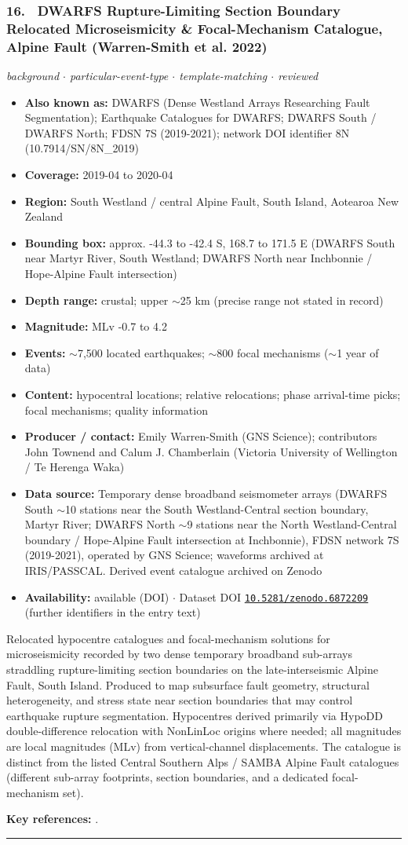 \documentclass[10pt,a4paper]{article}
\newcommand{\catentryrule}{\par\vspace{3pt}\noindent\textcolor{rulegrey}{\rule{\linewidth}{0.3pt}}\par\vspace{5pt}}
\newcommand{\kv}[2]{\item \textbf{#1:} #2}
\begin{document}
\subsubsection*{\hypertarget{c:16}{16.}~ DWARFS Rupture-Limiting Section Boundary Relocated Microseismicity \& Focal-Mechanism Catalogue, Alpine Fault (Warren-Smith et al. 2022)}
{\small\itshape background $\cdot$ particular-event-type $\cdot$ template-matching $\cdot$ reviewed}\par\vspace{2pt}
\begin{itemize}[leftmargin=1.3em,itemsep=0.6pt,topsep=1pt,parsep=0pt]
\kv{Also known as}{DWARFS (Dense Westland Arrays Researching Fault Segmentation); Earthquake Catalogues for DWARFS; DWARFS South / DWARFS North; FDSN 7S (2019-2021); network DOI identifier 8N (10.7914/SN/8N\_2019)}
\kv{Coverage}{2019-04 to 2020-04}
\kv{Region}{South Westland / central Alpine Fault, South Island, Aotearoa New Zealand}
\kv{Bounding box}{approx. -44.3 to -42.4 S, 168.7 to 171.5 E (DWARFS South near Martyr River, South Westland; DWARFS North near Inchbonnie / Hope-Alpine Fault intersection)}
\kv{Depth range}{crustal; upper $\sim$25 km (precise range not stated in record)}
\kv{Magnitude}{MLv -0.7 to 4.2}
\kv{Events}{$\sim$7,500 located earthquakes; $\sim$800 focal mechanisms ($\sim$1 year of data)}
\kv{Content}{hypocentral locations; relative relocations; phase arrival-time picks; focal mechanisms; quality information}
\kv{Producer / contact}{Emily Warren-Smith (GNS Science); contributors John Townend and Calum J. Chamberlain (Victoria University of Wellington / Te Herenga Waka)}
\kv{Data source}{Temporary dense broadband seismometer arrays (DWARFS South $\sim$10 stations near the South Westland-Central section boundary, Martyr River; DWARFS North $\sim$9 stations near the North Westland-Central boundary / Hope-Alpine Fault intersection at Inchbonnie), FDSN network 7S (2019-2021), operated by GNS Science; waveforms archived at IRIS/PASSCAL. Derived event catalogue archived on Zenodo}
\kv{Availability}{available (DOI) $\cdot$ Dataset DOI \href{https://doi.org/10.5281/zenodo.6872209}{\nolinkurl{10.5281/zenodo.6872209}} (further identifiers in the entry text)}
\end{itemize}
\par\vspace{2pt}Relocated hypocentre catalogues and focal-mechanism solutions for microseismicity recorded by two dense temporary broadband sub-arrays straddling rupture-limiting section boundaries on the late-interseismic Alpine Fault, South Island. Produced to map subsurface fault geometry, structural heterogeneity, and stress state near section boundaries that may control earthquake rupture segmentation. Hypocentres derived primarily via HypoDD double-difference relocation with NonLinLoc origins where needed; all magnitudes are local magnitudes (MLv) from vertical-channel displacements. The catalogue is distinct from the listed Central Southern Alps / SAMBA Alpine Fault catalogues (different sub-array footprints, section boundaries, and a dedicated focal-mechanism set).
\par\vspace{2pt}\textbf{Key references:} \cite{WarrenSmith2022,WarrenSmith2022a,GNSScience2019}.
\catentryrule
\end{document}
